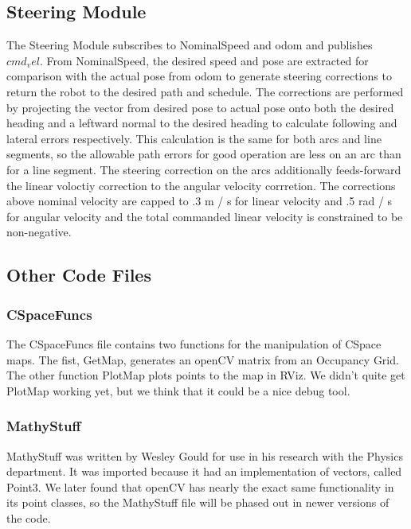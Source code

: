 \documentclass{article}
\begin{document}


\subsection{Steering Module}

The Steering Module subscribes to NominalSpeed and odom and publishes $cmd_vel$.
From NominalSpeed, the desired speed and pose are extracted for comparison with the actual pose from odom to generate steering corrections to return the robot to the desired path and schedule.
The corrections are performed by projecting the vector from desired pose to actual pose onto both the desired heading and a leftward normal to the desired heading to calculate following and lateral errors respectively.
This calculation is the same for both arcs and line segments, so the allowable path errors for good operation are less on an arc than for a line segment.
The steering correction on the arcs additionally feeds-forward the linear voloctiy correction to the angular velocity corrretion.
The corrections above nominal velocity are capped to .3 m / s for linear velocity and .5 rad / s for angular velocity and the total commanded linear velocity is constrained to be non-negative.



\subsection{Other Code Files}
\subsubsection{CSpaceFuncs}
The CSpaceFuncs file contains two functions for the manipulation of CSpace maps.  The fist, GetMap, generates an openCV matrix from an Occupancy Grid.  The other function PlotMap plots points to the map in RViz.  We didn't quite get PlotMap working yet, but we think that it could be a nice debug tool.





\subsubsection{MathyStuff}
MathyStuff was written by Wesley Gould for use in his research with the Physics department.  It was imported because it had an implementation of vectors, called Point3.  We later found that openCV has nearly the exact same functionality in its point classes, so the MathyStuff file will be phased out in newer versions of the code.
\end{document}
